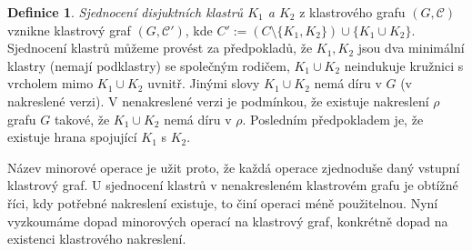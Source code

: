 \documentclass[12pt,a4report]{report}
\theoremstyle{definition}
\newtheorem{defn}[theorem]{Definice}
\begin{document}
\begin{defn}
\textit{Sjednocení disjuktních klastrů $K_1$ a $K_2$} z klastrového grafu $(G, \mathcal C)$ vznikne klastrový graf  $(G, \mathcal C')$, kde $C'  := (C\setminus \{K_1,K_2\}) \cup \{K_1 \cup K_2\}$. Sjednocení klastrů můžeme provést za předpokladů, že $K_1, K_2$ jsou dva minimální klastry (nemají podklastry) se společným rodičem, $K_1 \cup K_2$ neindukuje kružnici s vrcholem mimo $K_1 \cup K_2$ uvnitř. Jinými slovy $K_1 \cup K_2$ nemá díru v $G$ (v nakreslené verzi). V nenakreslené verzi je podmínkou, že existuje nakreslení $\rho$ grafu $G$ takové, že $K_1 \cup K_2$ nemá díru v $\rho$. Posledním předpokladem je, že existuje hrana spojující $K_1$ s $K_2$.
\end{defn}

Název minorové operace je užit proto, že každá operace zjednoduše daný vstupní klastrový graf. U sjednocení klastrů v nenakresleném klastrovém grafu je obtížné říci, kdy potřebné nakreslení existuje, to činí operaci méně použitelnou.
Nyní vyzkoumáme dopad minorových operací na klastrový graf, konkrétně dopad na existenci klastrového nakreslení.
\end{document}

